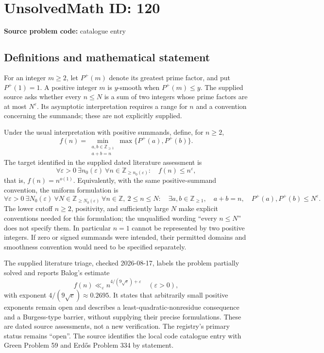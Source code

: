 \documentclass[11pt]{article}
\newcommand{\Z}{\mathbb{Z}}
\begin{document}
\section*{UnsolvedMath ID: 120}
\textbf{Source problem code:} catalogue entry
\subsection{Definitions and mathematical statement}
For an integer $m\geq 2$, let $P^{+}(m)$ denote its greatest prime factor, and put $P^{+}(1)=1$. A positive integer $m$ is $y$-smooth when $P^{+}(m)\leq y$. The supplied source asks whether every $n\leq N$ is a sum of two integers whose prime factors are at most $N^{\varepsilon}$. Its asymptotic interpretation requires a range for $n$ and a convention concerning the summands; these are not explicitly supplied.

Under the usual interpretation with positive summands, define, for $n\geq2$,
\[
f(n)=\min_{\substack{a,b\in\Z_{\geq1}\\a+b=n}}\max\{P^{+}(a),P^{+}(b)\}.
\]
The target identified in the supplied dated literature assessment is
\[
\forall\varepsilon>0\ \exists n_0(\varepsilon)\ \forall n\in\Z_{\geq n_0(\varepsilon)}:\quad f(n)\leq n^{\varepsilon},
\]
that is, $f(n)=n^{o(1)}$. Equivalently, with the same positive-summand convention, the uniform formulation is
\[
\forall\varepsilon>0\ \exists N_0(\varepsilon)\ \forall N\in\Z_{\geq N_0(\varepsilon)}\ \forall n\in\Z,\ 2\leq n\leq N:\quad
\exists a,b\in\Z_{\geq1},\quad a+b=n,\quad P^{+}(a),P^{+}(b)\leq N^{\varepsilon}.
\]
The lower cutoff $n\geq2$, positivity, and sufficiently large $N$ make explicit conventions needed for this formulation; the unqualified wording ``every $n\leq N$'' does not specify them. In particular $n=1$ cannot be represented by two positive integers. If zero or signed summands were intended, their permitted domains and smoothness convention would need to be specified separately.

The supplied literature triage, checked 2026-08-17, labels the problem partially solved and reports Balog's estimate
\[
f(n)\ll_{\varepsilon}n^{4/(9\sqrt e)+\varepsilon}
\quad(\varepsilon>0),
\]
with exponent $4/(9\sqrt e)\approx0.2695$. It states that arbitrarily small positive exponents remain open and describes a least-quadratic-nonresidue consequence and a Burgess-type barrier, without supplying their precise formulations. These are dated source assessments, not a new verification. The registry's primary status remains ``open''. The source identifies the local code catalogue entry with Green Problem 59 and Erd\H{o}s Problem 334 by statement.
\end{document}
